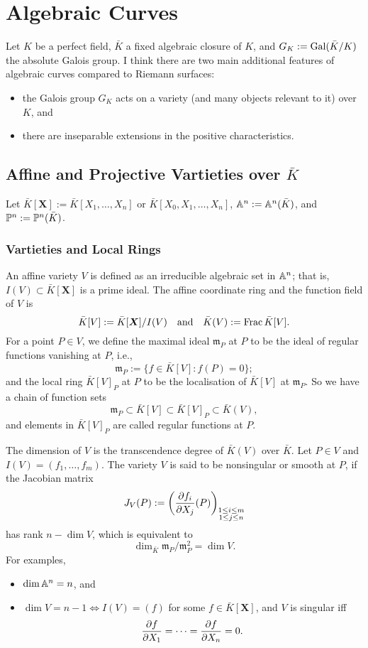 \section{Algebraic Curves}
Let $K$ be a perfect field, $\bar{K}$ a fixed algebraic closure of $K$, and $G_K := \gal(\bar{K}/K)$ the absolute Galois group.
I think there are two main additional features of algebraic curves compared to Riemann surfaces:\begin{itemize}
    \item the Galois group $G_K$ acts on a variety (and many objects relevant to it) over $K$, and
    \item there are inseparable extensions in the positive characteristics.
\end{itemize}

\subsection{Affine and Projective Vartieties over \texorpdfstring{$\bar{K}$}{bar K}}

Let $\bar{K}[\boldsymbol{X}] := \bar{K}[X_1, \dots, X_n]$ or $\bar{K}[X_0, X_1, \dots, X_n]$, $\A^n := \A^n(\bar K)$, and $\P^n:=\P^n(\bar{K})$.

\subsubsection{Vartieties and Local Rings}
An affine variety $V$ is defined as an irreducible algebraic set in $\A^n$; that is, $I(V)\subset \bar{K}[\boldsymbol{X}]$ is a prime ideal.
The affine coordinate ring and the function field of $V$ is \[\bar{K}[V] := \bar{K}[\boldsymbol{X}]/I(V) \myand \bar{K}(V) := \Frac \bar{K}[V].\]
For a point $P\in V$, we define the maximal ideal $\mathfrak{m}_P$ at $P$ to be the ideal of regular functions vanishing at $P$, i.e.,\[\mathfrak{m}_P := \{f\in \bar{K}[V] : f(P) = 0\};\]
and the local ring $\bar{K}[V]_P$ at $P$ to be the localisation of $\bar{K}[V]$ at $\mathfrak{m}_P$.
So we have a chain of function sets \[\mathfrak{m}_P \subset \bar{K}[V] \subset \bar{K}[V]_P \subset \bar{K}(V), \]
and elements in $\bar{K}[V]_P$ are called regular functions at $P$.

The dimension of $V$ is the transcendence degree of $\bar{K}(V)$ over $\bar{K}$. 
Let $P\in V$ and $I(V) = (f_1, \dots, f_m)$. The variety $V$ is said to be nonsingular or smooth at $P$, if the Jacobian matrix \[J_V(P) := \left( \pdfrac{f_i}{X_j}(P) \right)_{\substack{1\le i\le m \\ 1\le j\le n}}\] has rank $n - \dim V$, which is equivalent to \[\dim_{\bar{K}}\mathfrak{m}_P/\mathfrak{m}_P^2 = \dim V.\]
For examples, 
\begin{itemize}
    \item $\dim\A^n = n$, and
    \item $\dim V = n - 1 \iff I(V) = (f)$ for some $f\in \bar{K}[\boldsymbol{X}]$, and $V$ is singular iff \[\pdfrac{f}{X_1} = \dots = \pdfrac{f}{X_n} = 0.\]
\end{itemize}

